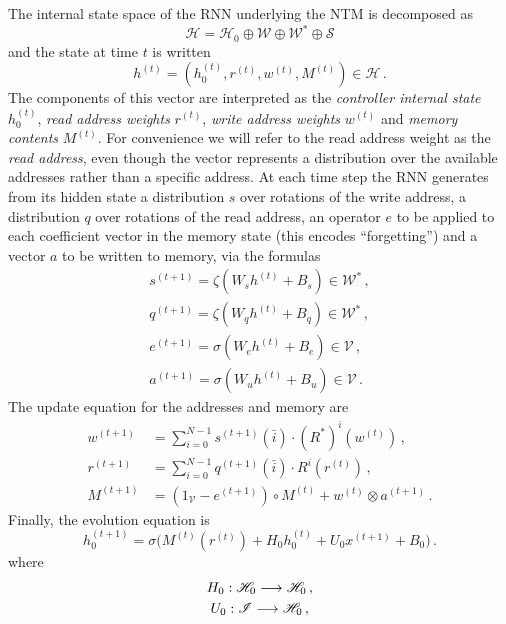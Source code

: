 \documentclass[english,letter paper,12pt,leqno]{article}
\theoremstyle{example}
\numberwithin{equation}{section}
\def\be{\begin{equation}}
\def\ee{\end{equation}}
\begin{document}
The internal state space of the RNN underlying the NTM is decomposed as
\be\label{eq:decomp}
\mathscr{H} = \mathscr{H}_0 \oplus \mathscr{W} \oplus \mathscr{W}^* \oplus \mathscr{S}
\ee
and the state at time $t$ is written
\[
h^{(t)} = (h_0^{(t)}, r^{(t)}, w^{(t)}, M^{(t)}) \in \mathscr{H}\,.
\]
The components of this vector are interpreted as the \emph{controller internal state} $h_0^{(t)}$, \emph{read address weights} $r^{(t)}$, \emph{write address weights} $w^{(t)}$ and \emph{memory contents} $M^{(t)}$. For convenience we will refer to the read address weight as the \emph{read address}, even though the vector represents a distribution over the available addresses rather than a specific address. At each time step the RNN generates from its hidden state a distribution $s$ over rotations of the write address, a distribution $q$ over rotations of the read address, an operator $e$ to be applied to each coefficient vector in the memory state (this encodes ``forgetting'') and a vector $a$ to be written to memory, via the formulas
\begin{gather*}
s^{(t+1)} = \zeta( W_s h^{(t)} + B_s ) \in \mathscr{W}^*\,,\\
q^{(t+1)} = \zeta( W_q h^{(t)} + B_q ) \in \mathscr{W}^*\,,\\
e^{(t+1)} = \sigma( W_e h^{(t)} + B_e ) \in \mathscr{V}\,,\\
a^{(t+1)} = \sigma( W_u h^{(t)} + B_u ) \in \mathscr{V}\,.
\end{gather*}
The update equation for the addresses \cite[Eq. (8)]{ntm} and memory \cite[Eq. (3),(4)]{ntm} are
\begin{align}
w^{(t+1)} &= \sum_{i=0}^{N-1} s^{(t+1)}(\bar{i}) \cdot (R^*)^i( w^{(t)} )\,,\label{eq:ntm_update1}
\\
r^{(t+1)} &= \sum_{i=0}^{N-1} q^{(t+1)}(\bar{i}) \cdot R^i( r^{(t)} )\,,\label{eq:ntm_update2}\\
M^{(t+1)} &= (1_{\mathscr{V}} - e^{(t+1)} ) \circ M^{(t)} + w^{(t)} \otimes a^{(t+1)}\,.\label{eq:ntm_update3}
\end{align}
Finally, the evolution equation is
\be\label{eq:NTMequation}
h_0^{(t+1)} = \sigma\Big( M^{(t)}(r^{(t)}) + H_0 h_0^{(t)} + U_0 x^{(t+1)} + B_0 \Big)\,.
\ee 
where
\begin{gather*}
H_0: \mathscr{H}_0 \longrightarrow \mathscr{H}_0\,,\\
U_0: \mathscr{I} \longrightarrow \mathscr{H}_0\,,
\end{gather*}
\end{document}
